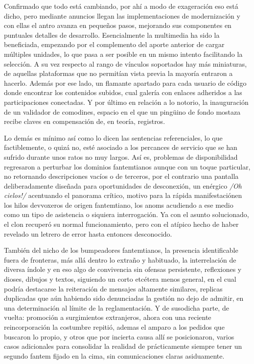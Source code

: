 \documentclass[
]{book}
\begin{document}
Confirmado que todo está cambiando, por ahí a modo de exageración eso está dicho, pero mediante anuncios llegan las implementaciones de modernización y con ellas el antro avanza en pequeños pasos, mejorando sus componentes en puntuales detalles de desarrollo. Esencialmente la multimedia ha sido la beneficiada, empezando por el complemento del aporte anterior de cargar múltiples unidades, lo que pasa a ser posible en un mismo intento facilitando la selección. A su vez respecto al rango de vínculos soportados hay más miniaturas, de aquellas plataformas que no permitían vista previa la mayoría entraron a hacerlo. Además por ese lado, un flamante apartado para cada usuario de código donde encontrar los contenidos subidos, cual galería con enlaces adheridos a las participaciones conectadas. Y por último en relación a lo notorio, la inauguración de un validador de comodines, espacio en el que un pingüino de fondo mostaza recibe claves en compensación de, en teoría, registros.

Lo demás es mínimo así como lo dicen las sentencias referenciales, lo que factiblemente, o quizá no, esté asociado a los percances de servicio que se han sufrido durante unos ratos no muy largos. Así es, problemas de disponibilidad regresaron a perturbar los dominios fantemtianos aunque con un toque particular, no retornando descripciones vacíos o de terceros, por el contrario una pantalla deliberadamente diseñada para oportunidades de desconexión, un enérgico \emph{/Oh cielos!/} acentuando el panorama crítico, motivo para la rápida manifestaciónen los hilos devvoxeros de origen fantemtiano, los anoms acudiendo a ese medio como un tipo de asistencia o siquiera interrogación. Ya con el asunto solucionado, el clon recuperó su normal funcionamiento, pero con el atípico hecho de haber revelado un letrero de error hasta entonces desconocido.

También del nicho de los bumpeadores fantemtianos, la presencia identificable fuera de fronteras, más allá dentro lo extraño y habituado, la interrelación de diversa índole y en eso algo de convivencia sin ofensas persistente, reflexiones y dioses, dibujos y textos, siguiendo un corto etcétera menos general, en el cual podría destacarse la reiteración de mensajes altamente similares, replicas duplicadas que aún habiendo sido denunciadas la gestión no dejo de admitir, en una determinación al límite de la reglamentación. Y de susodicha parte, de vuelta: promoción a surgimientos extranjeros, ahora con una reciente reincorporación la costumbre repitió, ademas el amparo a los pedidos que buscaron lo propio, y otros que por incierta causa allí se posicionaron, varios casos adicionales para consolidar la realidad de prácticamente siempre tener un segundo fantem fijado en la cima, sin comunicaciones claras asiduamente.
\end{document}
